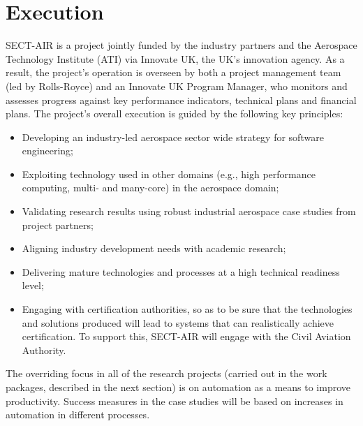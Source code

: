 \section{Execution}
\label{sec:execution}

SECT-AIR is a project jointly funded by the industry partners and the Aerospace Technology Institute (ATI) via Innovate UK, the UK's innovation agency. As a result, the project's operation is overseen by both a project management team (led by Rolls-Royce) and an Innovate UK Program Manager, who monitors and assesses progress against key performance indicators, technical plans and financial plans. The project's overall execution is guided by the following key principles:
\begin{itemize}
\item Developing an industry-led aerospace sector wide strategy for software engineering;
\item Exploiting technology used in other domains (e.g., high performance computing, multi- and many-core) in the aerospace domain;
\item Validating research results using robust industrial aerospace case studies from project partners;
\item Aligning industry development needs with academic research;
\item Delivering mature technologies and processes at a high technical readiness level;
\item Engaging with certification authorities, so as to be sure that the technologies and solutions produced will lead to systems that can realistically achieve certification. To support this, SECT-AIR will engage with the Civil Aviation Authority.
\end{itemize}
The overriding focus in all of the research projects (carried out in the work packages, described in the next section) is on automation as a means to improve productivity. Success measures in the case studies will be based on increases in automation in different processes.




